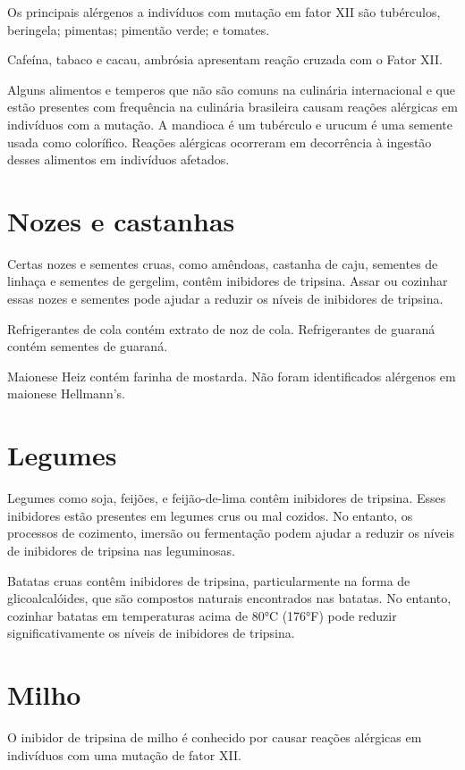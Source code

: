 \documentclass{article}
\begin{document}
Os principais alérgenos a indivíduos com mutação em fator XII são tubérculos, beringela; pimentas; pimentão verde; e tomates.

Cafeína, tabaco e cacau, ambrósia apresentam reação cruzada com o Fator XII.

Alguns alimentos e temperos que não são comuns na culinária internacional e
que estão presentes com frequência na culinária brasileira causam reações
alérgicas em indivíduos com a mutação. A mandioca é um tubérculo e urucum
é uma semente usada como colorífico. Reações alérgicas ocorreram em decorrência
à ingestão desses alimentos em indivíduos afetados.

\section{Nozes e castanhas}

Certas nozes e sementes cruas, como amêndoas, castanha de caju, sementes de linhaça e sementes de gergelim, contêm inibidores de tripsina. Assar ou cozinhar essas nozes e sementes pode ajudar a reduzir os níveis de inibidores de tripsina.

Refrigerantes de cola contém extrato de noz de cola.
Refrigerantes de guaraná contém sementes de guaraná.

Maionese Heiz contém farinha de mostarda.
Não foram identificados alérgenos em maionese Hellmann's.

\section{Legumes}

Legumes como soja, feijões, e feijão-de-lima contêm inibidores de tripsina.
Esses inibidores estão presentes em legumes crus ou mal cozidos.
No entanto, os processos de cozimento, imersão ou fermentação podem ajudar a reduzir os níveis de inibidores de tripsina nas leguminosas.

Batatas cruas contêm inibidores de tripsina, particularmente na forma de glicoalcalóides, que são compostos naturais encontrados nas batatas. No entanto, cozinhar batatas em temperaturas acima de 80°C (176°F) pode reduzir significativamente os níveis de inibidores de tripsina.

\section{Milho}

O inibidor de tripsina de milho é conhecido por causar reações
alérgicas em indivíduos com uma mutação de fator XII.
\end{document}
